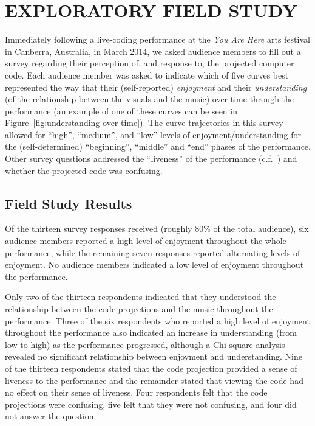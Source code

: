 \documentclass{sig-alternate}
\begin{document}
\section*{EXPLORATORY FIELD STUDY}

Immediately following a live-coding performance at the \emph{You Are
Here} arts festival in Canberra, Australia, in March 2014, we asked
audience members to fill out a survey regarding their perception of,
and response to, the projected computer code. Each audience member was
asked to indicate which of five curves best represented the way that
their (self-reported) \emph{enjoyment} and their
\emph{understanding} (of the relationship between the visuals and
the music) over time through the performance (an example of one of
these curves can be seen in Figure~\ref{fig:understanding-over-time}).
The curve trajectories in this survey allowed for ``high'',
``medium'', and ``low'' levels of enjoyment/understanding for the
(self-determined) ``beginning'', ``middle'' and ``end'' phases of the
performance. Other survey questions addressed the ``liveness'' of the
performance (c.f.~\citealp{Auslander}) and whether the projected code was
confusing.

\subsection*{Field Study Results}

Of the thirteen survey responses received (roughly $80\%$ of the total
audience), six audience members reported a high level of enjoyment
throughout the whole performance, while the remaining seven responses
reported alternating levels of enjoyment. No audience members
indicated a low level of enjoyment throughout the performance.

Only two of the thirteen respondents indicated that they understood
the relationship between the code projections and the music throughout
the performance. Three of the six respondents who reported a high
level of enjoyment throughout the performance also indicated an
increase in understanding (from low to high) as the performance
progressed, although a Chi-square analysis revealed no significant
relationship between enjoyment and understanding. Nine of the thirteen
respondents stated that the code projection provided a sense of
liveness to the performance and the remainder stated that viewing the
code had no effect on their sense of liveness. Four respondents felt
that the code projections were confusing, five felt that they were not
confusing, and four did not answer the question.
\end{document}
